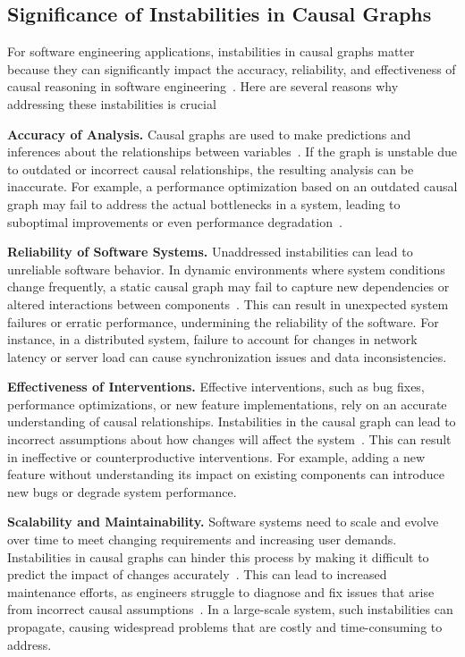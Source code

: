 \documentclass[]{svjour3}
\begin{document}
 


\subsection{Significance of Instabilities in Causal Graphs}

For software engineering applications,
instabilities in causal graphs matter because they can significantly impact the accuracy, reliability, and effectiveness of causal reasoning in software engineering~\cite{chindelevitch2012assessing}. 
Here are several reasons why addressing these instabilities is crucial 

 \textbf{Accuracy of Analysis.} Causal graphs are used to make predictions and inferences about the relationships between variables~\cite{liang2021normalized}. If the graph is unstable due to outdated or incorrect causal relationships, the resulting analysis can be inaccurate. For example, a performance optimization based on an outdated causal graph may fail to address the actual bottlenecks in a system, leading to suboptimal improvements or even performance degradation~\cite{10.1007/978-3-030-59152-6_19, 10.1145/3492321.3519575}.

 \textbf{Reliability of Software Systems.} Unaddressed instabilities can lead to unreliable software behavior. In dynamic environments where system conditions change frequently, a static causal graph may fail to capture new dependencies or altered interactions between components~\cite{7097740}. This can result in unexpected system failures or erratic performance, undermining the reliability of the software. For instance, in a distributed system, failure to account for changes in network latency or server load can cause synchronization issues and data inconsistencies.

 \textbf{Effectiveness of Interventions.} Effective interventions, such as bug fixes, performance optimizations, or new feature implementations, rely on an accurate understanding of causal relationships. Instabilities in the causal graph can lead to incorrect assumptions about how changes will affect the system~\cite{sharma2021dowhy}. This can result in ineffective or counterproductive interventions. For example, adding a new feature without understanding its impact on existing components can introduce new bugs or degrade system performance.

  \textbf{Scalability and Maintainability.} Software systems need to scale and evolve over time to meet changing requirements and increasing user demands. Instabilities in causal graphs can hinder this process by making it difficult to predict the impact of changes accurately~\cite{9218193}. This can lead to increased maintenance efforts, as engineers struggle to diagnose and fix issues that arise from incorrect causal assumptions~\cite{7321183}. In a large-scale system, such instabilities can propagate, causing widespread problems that are costly and time-consuming to address.
\end{document}
